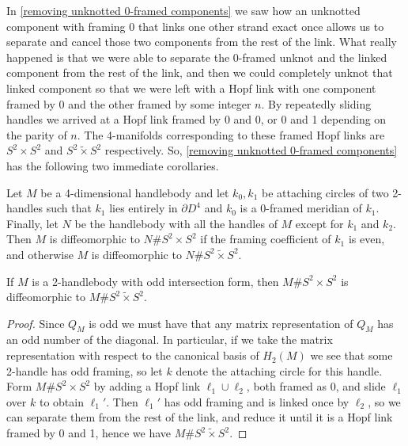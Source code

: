 In \cref{removing unknotted 0-framed components} we saw how an unknotted component with framing 0 that links one other strand exact once allows us to separate and cancel those two components from the rest of the link. What really happened is that we were able to separate the 0-framed unknot and the linked component from the rest of the link, and then we could completely unknot that linked component so that we were left with a Hopf link with one component framed by 0 and the other framed by some integer $n$. By repeatedly sliding handles we arrived at a Hopf link framed by 0 and 0, or 0 and 1 depending on the parity of $n$. The 4-manifolds corresponding to these framed Hopf links are $S^2 \times S^2$ and $S^2 \tilde{\times} S^2$ respectively. So, \cref{removing unknotted 0-framed components} has the following two immediate corollaries.
\begin{cor}
Let $M$ be a 4-dimensional handlebody and let $k_0,k_1$ be attaching circles of two 2-handles such that $k_1$ lies entirely in $\partial D^4$ and $k_0$ is a 0-framed meridian of $k_1$. Finally, let $N$ be the handlebody with all the handles of $M$ except for $k_1$ and $k_2$. Then $M$ is diffeomorphic to $N \# S^2 \times S^2$ if the framing coefficient of $k_1$ is even, and otherwise $M$ is diffeomorphic to $N \# S^2 \tilde{\times} S^2$. 
\end{cor}
\begin{cor}
If $M$ is a 2-handlebody with odd intersection form, then $M \# S^2 \times S^2$ is diffeomorphic to $M \# S^2 \tilde{\times} S^2$.
\end{cor}
\begin{proof}
Since $Q_M$ is odd we must have that any matrix representation of $Q_M$ has an odd number of the diagonal. In particular, if we take the matrix representation with respect to the canonical basis of $H_2(M)$ we see that some 2-handle has odd framing, so let $k$ denote the attaching circle for this handle. Form $M \# S^2 \times S^2$ by adding a Hopf link $\ell_1\cup\ell_2$, both framed as 0, and slide $\ell_1$ over $k$ to obtain $\ell_1'$. Then $\ell_1'$ has odd framing and is linked once by $\ell_2$, so we can separate them from the rest of the link, and reduce it until it is a Hopf link framed by 0 and 1, hence we have $M \# S^2 \tilde{\times} S^2$.
\end{proof}





